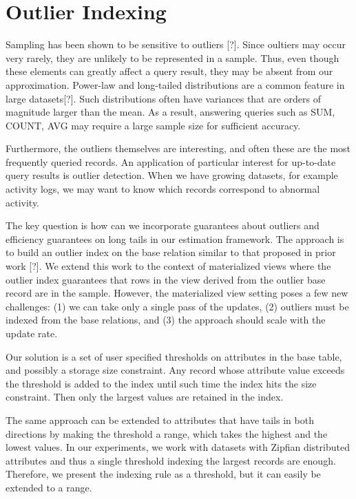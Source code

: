 \section{Outlier Indexing}
Sampling has been shown to be sensitive to outliers [?].
Since oultiers may occur very rarely, they are unlikely to be represented in a sample.
Thus, even though these elements can greatly affect a query result, they may be absent from our approximation.
Power-law and long-tailed distributions are a common feature in large datasets[?].
Such distributions often have variances that are orders of magnitude larger
than the mean.
As a result, answering queries such as SUM, COUNT, AVG may require a large 
sample size for sufficient accuracy.

Furthermore, the outliers themselves are interesting, and often these are the
most frequently queried records.
An application of particular interest for up-to-date query results
is outlier detection. When we have growing datasets, for example activity
logs, we may want to know which records correspond to abnormal activity.

The key question is how can we incorporate guarantees about outliers
and efficiency guarantees on long tails in our estimation framework.
The approach is to build an outlier index on the base relation similar to that proposed in prior work [?].
We extend this work to the context of materialized views where the outlier index guarantees
that rows in the view derived from the outlier base record are in the sample.
However, the materialized view setting poses a few new challenges: (1) we can take only
a single pass of the updates, (2) outliers must be indexed from the base relations, and
(3) the approach should scale with the update rate.

Our solution is a set of user specified thresholds on attributes in the base table, and possibly a storage size constraint.
Any record whose attribute value exceeds the threshold is added to the index until such time the index hits the size constraint.
Then only the largest values are retained in the index.

The same approach can be extended to attributes that have tails in both directions by making the threshold a range, which takes the highest and the lowest
values.
In our experiments, we work with datasets with Zipfian distributed attributes and thus a single threshold indexing the largest records are enough.
Therefore, we present the indexing rule as a threshold, but it can easily be extended to a range.

